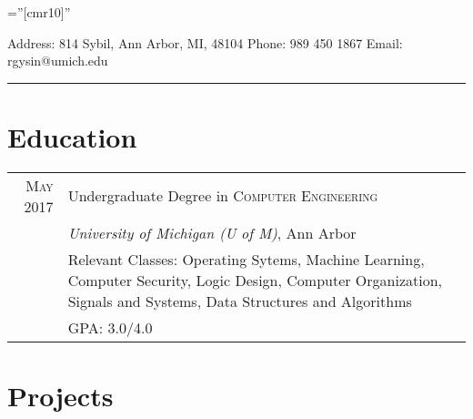 \documentclass[a4paper,10pt]{article} %
\begin{document}
\pagestyle{empty} %

\font\fb=''[cmr10]'' %


\par{\bigskip\par} %

Address: 814 Sybil, Ann Arbor, MI, 48104 \hfill Phone: 989 450 1867
\hfill Email: rgysin@umich.edu \\
\rule{\textwidth}{1pt}


\section{Education}

\begin{tabular}{r|p{12cm}}
\textsc{May} 2017\space\space& Undergraduate Degree in \textsc{Computer Engineering} \\
& \normalsize\emph{University of Michigan (U of M)}, Ann Arbor \\
& \footnotesize{Relevant Classes: Operating Sytems, Machine Learning,
  Computer Security, Logic Design, Computer Organization, Signals and Systems,
  Data Structures and Algorithms} \\
& \footnotesize{GPA: 3.0/4.0} \\
\end{tabular}


\section{Projects}
\end{document}
